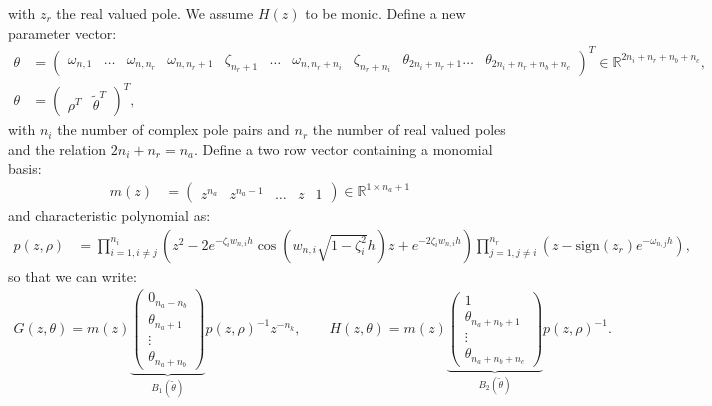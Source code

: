 \documentclass{article}
\begin{document}
with $z_r$ the real valued pole. We assume $H(z)$ to be monic. Define a new parameter vector:
\begin{equation}
\begin{aligned}
\theta  &= \begin{pmatrix} \omega_{n,1} & \ldots & \omega_{n,n_r} & \omega_{n,n_r+1} & \zeta_{n_r+1} & \ldots & \omega_{n,n_r+n_i} & \zeta_{n_r+n_i} & \theta_{2n_i+n_r+1} \ldots & \theta_{2n_i+n_r+n_b+n_c} \end{pmatrix}^T \in \mathbb{R}^{2n_i+n_r+n_b+n_c}, \\
\theta &= \begin{pmatrix} \rho^T & \tilde{\theta}^T \end{pmatrix}^T, \nonumber
\end{aligned}
\end{equation}
with $n_i$ the number of complex pole pairs and $n_r$ the number of real valued poles and the relation $2n_i+n_r=n_a$. Define a two row vector containing a monomial basis:
\begin{equation}
\begin{aligned}
m(z) &= \begin{pmatrix} z^{n_a} & z^{n_a-1} & \dots & z & 1 \end{pmatrix} \in \mathbb{R}^{1 \times n_a+1}
\end{aligned}
\end{equation} 
and characteristic polynomial as:
\begin{equation}
\begin{aligned}
p(z,\rho) &= \prod_{i=1, i \neq j}^{n_i} \left( z^2 - 2 e^{-\zeta_i w_{n,i} h } \cos (w_{n,i} \sqrt{1-\zeta_i^2} h) z + e^{-2 \zeta_i w_{n,i} h}  \right)  \prod_{j=1, j \neq i}^{n_r} \left(  z- \text{sign}(z_r) e^{-\omega_{n,j}h} \right),
\end{aligned}
\end{equation}
so that we can write:
\begin{equation}
\begin{aligned}
G(z,\theta) = m(z) \underbrace{\begin{pmatrix} 0_{n_a-n_b} \\ \theta_{n_a+1}  \\ \vdots \\ \theta_{n_a+n_b} \end{pmatrix}}_{B_1(\tilde{\theta})} p(z,\rho)^{-1} z^{-n_k}, \qquad H(z,\theta) =   m(z) \underbrace{\begin{pmatrix}  1 \\  \theta_{n_a+n_b+1}  \\ \vdots \\ \theta_{n_a+n_b+n_c} \end{pmatrix}}_{B_2(\tilde{\theta})} p(z,\rho)^{-1}.
\end{aligned}
\end{equation}
\end{document}
